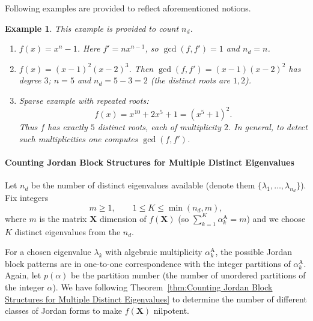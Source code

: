 \documentclass[11pt]{article}
\newtheorem{example}{Example}
\begin{document}
Following examples are provided to reflect aforementioned notions. 

\begin{example}
%
This example is provided to count $n_d$. 
%
\vspace{0.5em} %
\begin{enumerate}
  \item \(f(x)=x^n-1\). Here \(f' = n x^{n-1}\), so \(\gcd(f,f')=1\) and \(n_d=n\).
  \item \(f(x)=(x-1)^2(x-2)^3\). Then \(\gcd(f,f')=(x-1)(x-2)^2\) has degree \(3\); \(n=5\) and \(n_d=5-3=2\) (the distinct roots are \(1,2\)).
  \item Sparse example with repeated roots: 
\[
f(x) = x^{10} + 2x^5 + 1 = (x^5 + 1)^2.
\]
Thus \(f\) has exactly \(5\) distinct roots, each of multiplicity \(2\).  
In general, to detect such multiplicities one computes \(\gcd(f,f')\).
%
\end{enumerate}
%
\end{example}




\paragraph{Counting Jordan Block Structures for Multiple Distinct Eigenvalues}\label{sec:Counting Jordan Block Structures for Multiple Distinct Eigenvalues sparse}

Let \(n_d\) be the number of distinct eigenvalues available (denote them \(\{\lambda_1,\dots,\lambda_{n_d}\}\)).  
Fix integers
\[
m\ge 1, \qquad 1\le K\le \min(n_d,m),
\]
where \(m\) is the matrix $\bm{X}$ dimension of $f(\bm{X})$ (so \(\sum\limits_{k=1}^K \alpha_k^{\mathrm{A}}=m\)) and we choose \(K\) distinct eigenvalues from the \(n_d\).  

For a chosen eigenvalue \(\lambda_k\) with algebraic multiplicity \(\alpha_k^{\mathrm{A}}\), the possible Jordan block patterns are in one-to-one correspondence with the integer partitions of \(\alpha_k^{\mathrm{A}}\).  
Again, let \(p(\alpha)\) be the partition number (the number of unordered partitions of the integer \(\alpha\)). We have following Theorem~\ref{thm:Counting Jordan Block Structures for Multiple Distinct Eigenvalues} to determine the number of different classes of Jordan forms to make $f(\bm{X})$ nilpotent. 
\end{document}

